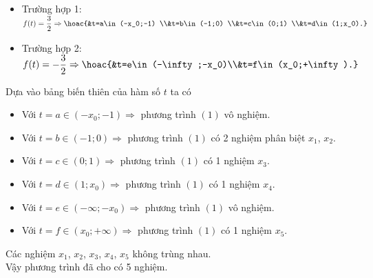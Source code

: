 \begin{ex}
{\begin{center}
		\end{center}
		\begin{itemize}
			\item Trường hợp 1: $ f(t)=\dfrac{3}{2}\Rightarrow \hoac{&t=a\in (-x_0;-1) \\&t=b\in (-1;0) \\&t=c\in (0;1) \\&t=d\in (1;x_0).}$
			\item Trường hợp 2: $ f(t)=-\dfrac{3}{2}\Rightarrow \hoac{&t=e\in (-\infty;-x_0)\\&t=f\in(x_0;+\infty).}$
		\end{itemize}
		Dựa vào bảng biến thiên của hàm số $ t$ ta có
		\begin{itemize}
			\item Với $ t=a\in (-x_0;-1)\Rightarrow $ phương trình $(1)$ vô nghiệm.
			\item Với $ t=b\in (-1;0)\Rightarrow $ phương trình $(1)$ có 2 nghiệm phân biệt $x_1$, $x_2$.
			\item Với $ t=c\in (0;1)\Rightarrow $ phương trình $(1)$ có 1 nghiệm $x_3$.
			\item Với $ t=d\in (1;x_0)\Rightarrow $ phương trình $(1)$ có 1 nghiệm $x_4$.
			\item Với $ t=e\in (-\infty ;-x_0)\Rightarrow $ phương trình $(1)$ vô nghiệm.
			\item Với $ t=f\in (x_0;+\infty)\Rightarrow $ phương trình $(1)$ có 1 nghiệm $x_5$.
		\end{itemize}
		Các nghiệm $x_1$, $x_2$, $x_3$, $x_4$, $x_5$ không trùng nhau.\\
		Vậy phương trình đã cho có 5 nghiệm.
	}
\end{ex}
